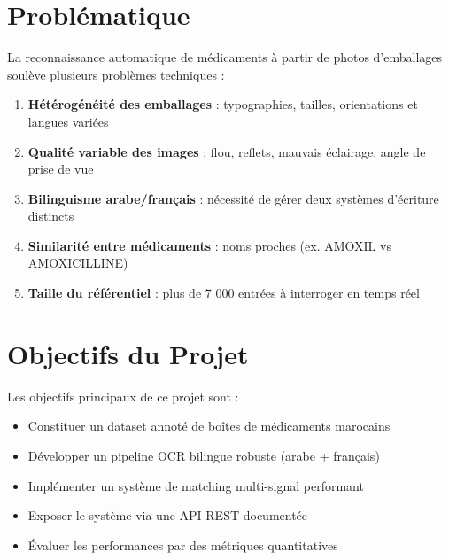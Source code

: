 \documentclass[12pt,a4paper]{report}
\begin{document}
\section{Probl\'ematique}

La reconnaissance automatique de m\'edicaments \`a partir de photos d'emballages soul\`eve plusieurs probl\`emes techniques :

\begin{warningbox}
\begin{enumerate}
  \item \textbf{H\'et\'erog\'en\'eit\'e des emballages} : typographies, tailles, orientations et langues vari\'ees
  \item \textbf{Qualit\'e variable des images} : flou, reflets, mauvais \'eclairage, angle de prise de vue
  \item \textbf{Bilinguisme arabe/fran\c{c}ais} : n\'ecessit\'e de g\'erer deux syst\`emes d'\'ecriture distincts
  \item \textbf{Similarit\'e entre m\'edicaments} : noms proches (ex. AMOXIL vs AMOXICILLINE)
  \item \textbf{Taille du r\'ef\'erentiel} : plus de 7 000 entr\'ees \`a interroger en temps r\'eel
\end{enumerate}
\end{warningbox}

\section{Objectifs du Projet}

Les objectifs principaux de ce projet sont :

\begin{successbox}[Objectifs]
\begin{itemize}
  \item[$\checkmark$] Constituer un dataset annot\'e de bo\^ites de m\'edicaments marocains
  \item[$\checkmark$] D\'evelopper un pipeline OCR bilingue robuste (arabe + fran\c{c}ais)
  \item[$\checkmark$] Impl\'ementer un syst\`eme de matching multi-signal performant
  \item[$\checkmark$] Exposer le syst\`eme via une API REST document\'ee
  \item[$\checkmark$] \'Evaluer les performances par des m\'etriques quantitatives
\end{itemize}
\end{successbox}
\end{document}
